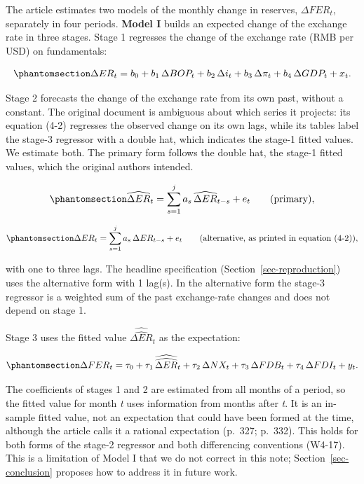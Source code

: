 \documentclass[
  12pt,
  a4paper,
]{article}
\begin{document}
The article estimates two models of the monthly change in reserves,
\(\Delta FER_t\), separately in four periods. \textbf{Model I} builds an
expected change of the exchange rate in three stages. Stage 1 regresses
the change of the exchange rate (RMB per USD) on fundamentals:

\begin{equation}\protect\phantomsection\label{eq-stage1}{
\Delta ER_t = b_0 + b_1\,\Delta BOP_t + b_2\,\Delta i_t + b_3\,\Delta \pi_t + b_4\,\Delta GDP_t + x_t .
}\end{equation}

Stage 2 forecasts the change of the exchange rate from its own past,
without a constant. The original document is ambiguous about which
series it projects: its equation (4-2) regresses the observed change on
its own lags, while its tables label the stage-3 regressor with a double
hat, which indicates the stage-1 fitted values. We estimate both. The
primary form follows the double hat, the stage-1 fitted values, which
the original authors intended.

\begin{equation}\protect\phantomsection\label{eq-stage2}{
\widehat{\Delta ER}_t = \sum_{s=1}^{j} a_s\,\widehat{\Delta ER}_{t-s} + e_t  \qquad \text{(primary)},
}\end{equation}

\begin{equation}\protect\phantomsection\label{eq-stage2b}{
\Delta ER_t = \sum_{s=1}^{j} a_s\, \Delta ER_{t-s} + e_t  \qquad \text{(alternative, as printed in equation (4-2))},
}\end{equation}

with one to three lags. The headline specification
(Section~\ref{sec-reproduction}) uses the alternative form with 1
lag(s). In the alternative form the stage-3 regressor is a weighted sum
of the past exchange-rate changes and does not depend on stage 1.

Stage 3 uses the fitted value \(\widehat{\widehat{\Delta ER}}_t\) as the
expectation:

\begin{equation}\protect\phantomsection\label{eq-stage3}{
\Delta FER_t = \tau_0 + \tau_1\,\widehat{\widehat{\Delta ER}}_t + \tau_2\,\Delta NX_t + \tau_3\,\Delta FDB_t + \tau_4\,\Delta FDI_t + y_t .
}\end{equation}

The coefficients of stages 1 and 2 are estimated from all months of a
period, so the fitted value for month \emph{t} uses information from
months after \emph{t}. It is an in-sample fitted value, not an
expectation that could have been formed at the time, although the
article calls it a rational expectation (p.~327; p.~332). This holds for
both forms of the stage-2 regressor and both differencing conventions
(W4-17). This is a limitation of Model I that we do not correct in this
note; Section~\ref{sec-conclusion} proposes how to address it in future
work.
\end{document}
